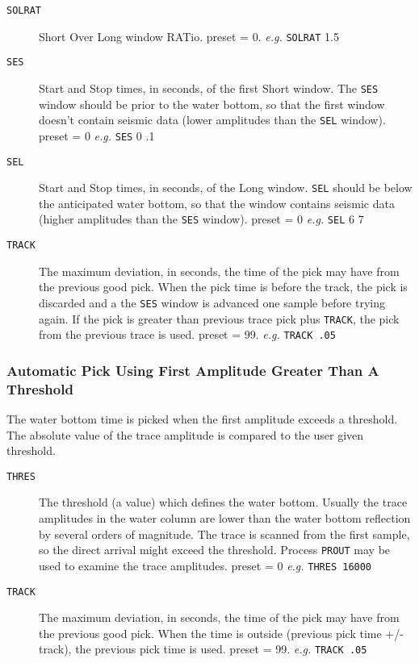 \begin{description}
\item[\texttt{SOLRAT}] Short Over Long window RATio.
         \Gls{preset} = 0.     \textit{e.g.}  \texttt{SOLRAT} 1.5

\item[\texttt{SES}] Start and Stop times, in seconds, of the first Short window.
         The \texttt{SES} window should be prior to the water bottom, so that
         the first window  doesn't contain seismic data (lower
         amplitudes than the \texttt{SEL} window).
         \Gls{preset} = 0      \textit{e.g.}    \texttt{SES} 0 .1

\item[\texttt{SEL}] Start and Stop times, in seconds, of the Long window.  \texttt{SEL}
         should be below the anticipated water bottom, so that the
         window contains seismic data (higher amplitudes than the \texttt{SES}
         window).
         \Gls{preset} = 0      \textit{e.g.}    \texttt{SEL} 6 7

\item[\texttt{TRACK}] The maximum deviation, in seconds, the time of the pick
         may have from the previous good pick.  When the pick time is
         before the track, the pick is discarded and a the \texttt{SES} window
         is advanced one sample before trying again.  If the pick is
         greater than previous trace pick plus \texttt{TRACK}, the pick from
         the previous trace is used.
         \Gls{preset} = 99.    \textit{e.g.}  \texttt{TRACK .05}
\end{description}

\subsubsection{Automatic Pick Using First Amplitude Greater Than A Threshold}

    The water bottom time is picked when the first amplitude exceeds
a threshold.  The absolute value of the trace amplitude is compared
to the user given threshold.

\begin{description}
\item[\texttt{THRES}] The threshold (a value) which defines the water bottom.
         Usually the trace amplitudes in the water column are lower
         than the water bottom reflection by several orders of
         magnitude.  The trace is scanned from the first sample, so
         the direct arrival might exceed the threshold.  Process
         \texttt{PROUT} may be used to examine the trace amplitudes.
         \Gls{preset} = 0     \textit{e.g.} \texttt{THRES 16000}

\item[\texttt{TRACK}] The maximum deviation, in seconds, the time of the pick
         may have from the previous good pick.  When the time is
         outside (previous pick time +/- track), the previous
         pick time is used.
         \Gls{preset} = 99.    \textit{e.g.}  \texttt{TRACK .05}
\end{description}

